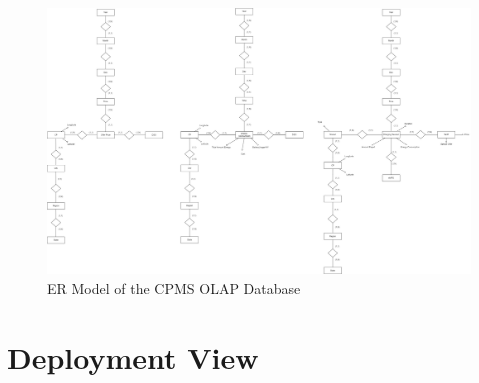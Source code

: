 \documentclass{Configuration_Files/PoliMi3i_thesis}
\begin{document}
\begin{figure}[H]
    \centering
    \includegraphics[width=1\textwidth]{Images/er-models/data_warehouse.jpg}
    \caption{ER Model of the CPMS OLAP Database}
    \label{fig:cpms-olap-er}
\end{figure}

\section{Deployment View}
\end{document}
